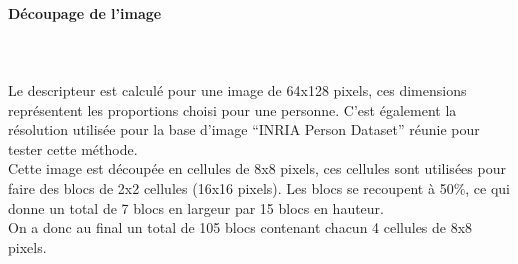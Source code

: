 \documentclass[12pt]{article}
\begin{document}
\paragraph{Découpage de l'image}~\\
\\
Le descripteur est calculé pour une image de 64x128 pixels, ces dimensions représentent les proportions choisi pour une personne. C'est également la résolution utilisée pour la base d'image ``INRIA Person Dataset'' réunie pour tester cette méthode.\\
Cette image est découpée en cellules de 8x8 pixels, ces cellules sont utilisées pour faire des blocs de 2x2 cellules (16x16 pixels). Les blocs se recoupent à 50\%, ce qui donne un total de 7 blocs en largeur par 15 blocs en hauteur.\\
On a donc au final un total de 105 blocs contenant chacun 4 cellules de 8x8 pixels.
\end{document}
